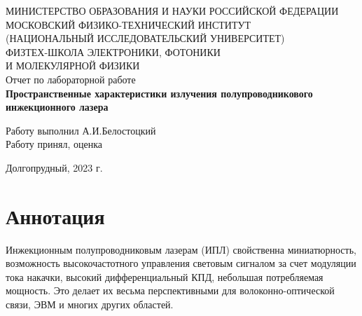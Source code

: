 \documentclass[a4paper,12pt]{article}
\begin{document}
 

\begin{titlepage}
	\begin{center}
		\large 	МИНИСТЕРСТВО ОБРАЗОВАНИЯ И НАУКИ РОССИЙСКОЙ ФЕДЕРАЦИИ\\
				МОСКОВСКИЙ ФИЗИКО-ТЕХНИЧЕСКИЙ ИНСТИТУТ \\
				(НАЦИОНАЛЬНЫЙ ИССЛЕДОВАТЕЛЬСКИЙ УНИВЕРСИТЕТ)\\ 
				ФИЗТЕХ-ШКОЛА ЭЛЕКТРОНИКИ, ФОТОНИКИ \\
				И МОЛЕКУЛЯРНОЙ ФИЗИКИ \\
		
		
		\vspace{4.0 cm}
		\LARGE{Отчет по лабораторной работе} \\ 
		\LARGE \textbf{Пространственные характеристики излучения полупроводникового инжекционного лазера} \\
	\end{center}
	\vspace{3 cm} \large

	\begin{flushleft}
		Работу выполнил \hspace{5.5cm}  \underline{\hspace{3cm}} А.И.Белостоцкий \\	
		\vspace{2cm}
		Работу принял, оценка \hspace{4.3cm} \underline{\hspace{3cm}}
	\end{flushleft}
	
	
	\vfill

	\begin{center}
	Долгопрудный, 2023 г.
	\end{center}
\end{titlepage}           

\tableofcontents

\newpage

\section{Аннотация}

Инжекционным полупроводниковым лазерам (ИПЛ) свойственна миниатюрность, возможность высокочастотного управления световым сигналом за счет модуляции тока накачки, высокий дифференциальный КПД, небольшая потребляемая мощность. Это делает их весьма перспективными для волоконно-оптической связи, ЭВМ и многих других областей. 
   
\end{document}
